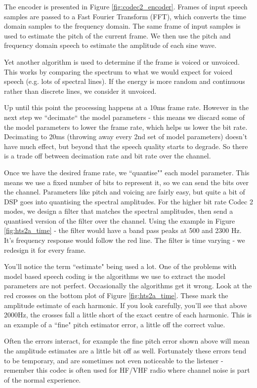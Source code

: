 \documentclass{article}
\begin{document}
The encoder is presented in Figure \ref{fig:codec2_encoder}.  Frames of input speech samples are passed to a Fast Fourier Transform (FFT), which converts the time domain samples to the frequency domain.  The same frame of input samples is used to estimate the pitch of the current frame. We then use the pitch and frequency domain speech to estimate the amplitude of each sine wave.

Yet another algorithm is used to determine if the frame is voiced or unvoiced.  This works by comparing the spectrum to what we would expect for voiced speech (e.g. lots of spectral lines).  If the energy is more random and continuous rather than discrete lines, we consider it unvoiced.

Up until this point the processing happens at a 10ms frame rate.  However in the next step we ``decimate`` the model parameters - this means we discard some of the model parameters to lower the frame rate, which helps us lower the bit rate.  Decimating to 20ms (throwing away every 2nd set of model parameters) doesn't have much effect, but beyond that the speech quality starts to degrade.  So there is a trade off between decimation rate and bit rate over the channel.

Once we have the desired frame rate, we ``quantise"" each model parameter.  This means we use a fixed number of bits to represent it, so we can send the bits over the channel.  Parameters like pitch and voicing are fairly easy, but quite a bit of DSP goes into quantising the spectral amplitudes. For the higher bit rate Codec 2 modes, we design a filter that matches the spectral amplitudes, then send a quantised version of the filter over the channel. Using the example in Figure \ref{fig:hts2a_time} - the filter would have a band pass peaks at 500 and 2300 Hz.  It's frequency response would follow the red line. The filter is time varying - we redesign it for every frame.

You'll notice the term ``estimate" being used a lot.  One of the problems with model based speech coding is the algorithms we use to extract the model parameters are not perfect.  Occasionally the algorithms get it wrong.  Look at the red crosses on the bottom plot of Figure \ref{fig:hts2a_time}.  These mark the amplitude estimate of each harmonic.  If you look carefully, you'll see that above 2000Hz, the crosses fall a little short of the exact centre of each harmonic.  This is an example of a ``fine" pitch estimator error, a little off the correct value.

Often the errors interact, for example the fine pitch error shown above will mean the amplitude estimates are a little bit off as well. Fortunately these errors tend to be temporary, and are sometimes not even noticeable to the listener - remember this codec is often used for HF/VHF radio where channel noise is part of the normal experience.
 
\end{document}
